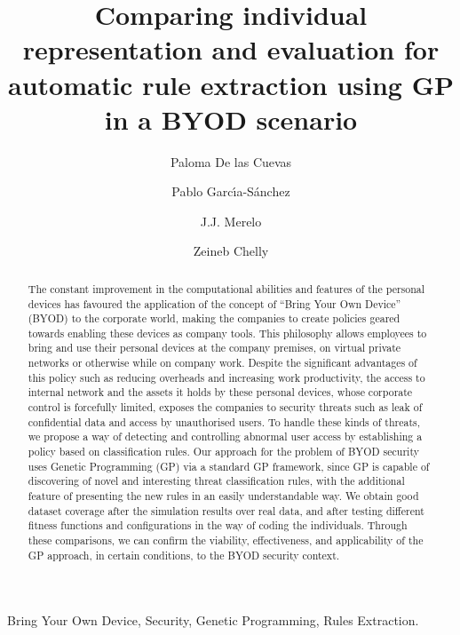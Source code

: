 \documentclass[a4paper,10pt,twocolumn,preprint,3p]{elsarticle}
\begin{document}
\begin{frontmatter}

\title{Comparing individual representation and evaluation for automatic rule extraction using GP in a BYOD scenario}

\author[ugr]{Paloma De las Cuevas}
\author[uca]{Pablo Garc\'{\i}a-S\'anchez}
\author[ugr]{J.J. Merelo}
\author[isgt]{Zeineb Chelly}

\address[ugr]{Department of Computer Architecture and Computer Technology, ETSIIT and CITIC \\
University of Granada, Granada, Spain. Tel: +34958241778. Fax: +34958248993}
\address[uca]{Department of Computer Engineering, School of Engineering \\
University of C\'adiz, Spain.}
\address[isgt]{LARODEC, Institut Sup\'erieur de Gestion de Tunis, Tunisia.}


\begin{abstract}
The constant improvement in the computational abilities and features of the personal devices has favoured the application of the concept of ``Bring Your Own Device'' (BYOD) to the corporate world, making the companies to
create policies geared towards enabling these devices as company tools. 
This philosophy allows
employees to bring and use their personal devices at
the company premises, on virtual private networks or otherwise while
on company work. Despite the significant advantages of this policy
such as reducing overheads and increasing work productivity, 
the
access to internal network and the assets it holds by these personal
devices, whose corporate control is forcefully limited, exposes the companies to
security threats such as leak of confidential data and access by
unauthorised users. 
To handle these kinds of threats, we propose a way of detecting and controlling abnormal user
access by establishing a policy based on classification rules. Our
approach for the problem of BYOD security uses Genetic Programming
(GP) via a standard GP framework, since GP is 
capable of discovering of novel and interesting threat classification
rules, with the additional feature of presenting the new rules in an
easily understandable way. %
We obtain good dataset coverage 
after the simulation results over real data, and after testing
different fitness functions and configurations in the way of coding the individuals.
Through these comparisons, we can confirm the 
viability, effectiveness, and applicability of the GP approach, in certain conditions, to the
BYOD security context. 
\end{abstract}


\begin{keyword}
Bring Your Own Device, Security, Genetic Programming, Rules Extraction. 
\end{keyword}

\end{frontmatter}
\end{document}
